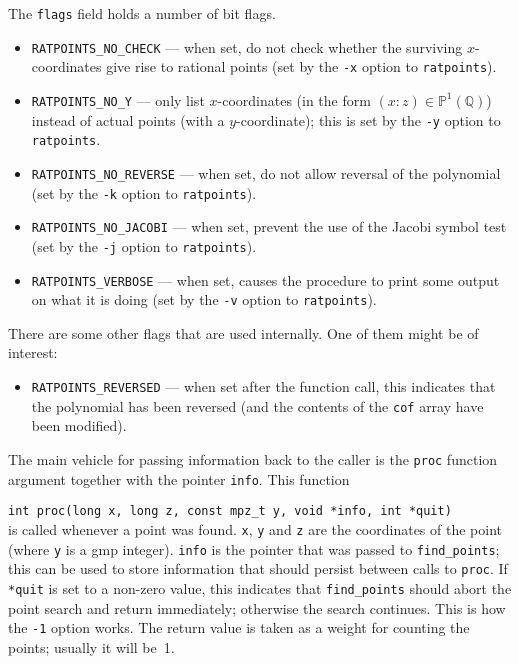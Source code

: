 \documentclass[12pt,a4paper,oneside]{amsart}
\newcommand{\Q}{{\mathbb Q}}
\newcommand{\BP}{{\mathbb P}}
\begin{document}
The \texttt{flags} field holds a number of bit flags.
\begin{itemize}
  \item \texttt{RATPOINTS\_NO\_CHECK} --- when set, do not check whether
        the surviving $x$-coordinates give rise to rational points
        (set by the \verb+-x+ option to \texttt{ratpoints}).
  \item \texttt{RATPOINTS\_NO\_Y} --- only list $x$-coordinates (in the
        form $(x : z) \in \BP^1(\Q)$) instead of actual points (with
        a $y$-coordinate); this is set by the \verb+-y+ option to
        \texttt{ratpoints}.
  \item \texttt{RATPOINTS\_NO\_REVERSE} --- when set, do not allow reversal
        of the polynomial (set by the \verb+-k+ option to \texttt{ratpoints}).
  \item \texttt{RATPOINTS\_NO\_JACOBI} --- when set, prevent the use of the
        Jacobi symbol test (set by the \verb+-j+ option to \texttt{ratpoints}).
  \item \texttt{RATPOINTS\_VERBOSE} --- when set, causes the procedure to
        print some output on what it is doing (set by the \verb+-v+ option
        to \texttt{ratpoints}).
\end{itemize}

There are some other flags that are used internally. One of them might be
of interest:
\begin{itemize}
  \item \texttt{RATPOINTS\_REVERSED} --- when set after the function call,
        this indicates that the polynomial has been reversed (and the
        contents of the \texttt{cof} array have been modified).
\end{itemize}

The main vehicle for passing information back to the caller is the
\texttt{proc} function argument together with the pointer \texttt{info}.
This function \\
\strut\quad\verb+int proc(long x, long z, const mpz_t y, void *info, int *quit)+ \\
is called whenever a point was found. \texttt{x}, \texttt{y} and \texttt{z} are
the coordinates of the point (where \texttt{y} is a gmp integer).
\texttt{info} is the pointer that was passed to \texttt{find\_points}; this
can be used to store information that should persist between calls
to \texttt{proc}. If \texttt{*quit} is set to a non-zero value, this indicates
that \texttt{find\_points} should abort the point search and return immediately;
otherwise the search continues. This is how the \verb+-1+ option works.
The return value is taken as a weight
for counting the points; usually it will be~1.
\end{document}
